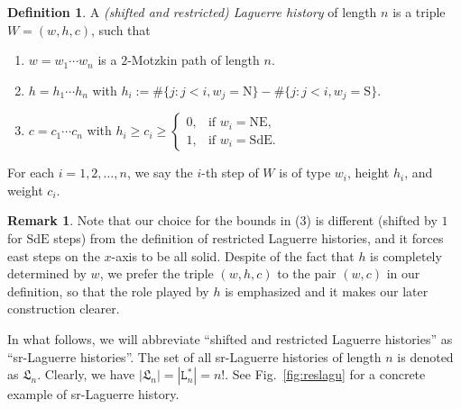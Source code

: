 \documentclass[12pt]{amsart}
\numberwithin{equation}{section}
\theoremstyle{plain}
\theoremstyle{definition}
\newtheorem{Def}[theorem]{Definition}
\newtheorem{remark}[theorem]{Remark}
\def\LH{\mathfrak{L}}
\def\N{\mathrm{N}}
\def\S{\mathrm{S}}
\def\NE{\mathrm{NE}}
\def\SdE{\mathrm{SdE}}
\begin{document}
\begin{Def}\label{def:LH}
A {\it (shifted and restricted) Laguerre history} of length $n$ is a triple $W=(w,h,c)$, such that
\begin{enumerate}
  \item $w=w_1\cdots w_n$ is a $2$-Motzkin path of length $n$.
  \item $h=h_1\cdots h_n$ with $h_i:=\#\{j : j<i, w_j=\N\}-\#\{j : j<i, w_j=\S\}$.
  \item $c=c_1\cdots c_n$ with $h_i\ge c_i\ge \begin{cases}
  0, & \text{if } w_i=\NE,\\
  1, & \text{if } w_i=\SdE.
  \end{cases}$
\end{enumerate}
For each $i=1,2,\ldots,n$, we say the $i$-th step of $W$ is of type $w_i$, height $h_i$, and weight $c_i$.
\end{Def}

\begin{remark}
Note that our choice for the bounds in (3) is different (shifted by $1$ for $\SdE$ steps) from the definition of restricted Laguerre histories, and it forces east steps on the $x$-axis to be all solid. Despite of the fact that $h$ is completely determined by $w$, we prefer the triple $(w,h,c)$ to the pair $(w,c)$ in our definition, so that the role played by $h$ is emphasized and it makes our later construction clearer.
\end{remark}

In what follows, we will abbreviate ``shifted and restricted Laguerre histories'' as ``sr-Laguerre histories''. The set of all sr-Laguerre histories of length $n$ is denoted as $\LH_n$. Clearly, we have $|\LH_n|=|\mathtt{L}_n^*|=n!$. See Fig.~\ref{fig:reslagu} for a concrete example of sr-Laguerre history.
\end{document}
